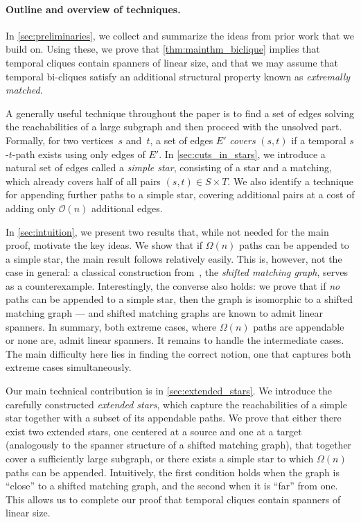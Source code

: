 \documentclass[11pt, letterpaper]{article}
\newcommand{\bigO}{\mathcal{O}}
\theoremstyle{definition}
\theoremstyle{plain}
\begin{document}
\paragraph{Outline and overview of techniques.}
In \cref{sec:preliminaries}, we collect and summarize the ideas from prior
work that we build on. Using these, we prove that \cref{thm:mainthm_biclique}
implies that temporal cliques contain spanners of linear size, and that we may assume that temporal bi-cliques satisfy an additional structural property known as
\emph{extremally matched}.

A generally useful technique throughout the paper is to find a set of edges solving the reachabilities of a large subgraph and then proceed with the unsolved part.
Formally, for two vertices~$s$ and~$t$, a set of edges $E'$ \emph{covers} $(s,t)$ if a temporal $s$-$t$-path exists using only edges of $E'$.
In \cref{sec:cuts_in_stars}, we introduce a natural set of edges called a \emph{simple star}, consisting of a star and a matching, which already covers half of all pairs $(s,t)\in S\times T$. We also identify a technique for appending further paths to a simple star, covering additional pairs at a cost of adding only $\bigO(n)$ additional edges.

In \cref{sec:intuition}, we present two results that, while not needed for the main proof, motivate the key ideas. We show that if $\Omega(n)$ paths can be appended to a simple star, the main result follows relatively easily.
This is, however, not the case in general: a classical construction from~\cite{Angrick24}, the \emph{shifted matching graph}, serves as a counterexample. 
Interestingly, the converse also holds: we prove that if \emph{no} paths can be appended to a simple star, then the graph is isomorphic to a shifted matching graph --- and shifted matching graphs are known to admit linear spanners. 
In summary, both extreme cases, where $\Omega(n)$ paths are appendable or none are, admit linear spanners. It remains to handle the intermediate cases.
The main difficulty here lies in finding the correct notion, one that captures both extreme cases simultaneously.

Our main technical contribution is in  \cref{sec:extended_stars}. We introduce the carefully constructed \emph{extended stars}, which capture the reachabilities of a simple star together with a subset of its appendable paths. 
We prove that either there exist two extended stars, one centered at a source and one at a target (analogously to the spanner structure of a shifted matching graph), that together cover a sufficiently large subgraph, or there exists a simple star to which $\Omega(n)$ paths can be appended. 
Intuitively, the first condition holds when the graph is ``close'' to a shifted matching graph, and the second when it is ``far'' from one.
This allows us to complete our proof that temporal cliques contain spanners of linear size.
\end{document}
